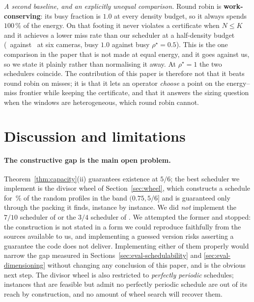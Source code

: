 \documentclass[preprint,review,12pt]{elsarticle}
\theoremstyle{definition}
\newcommand{\Nc}{N}
\newcommand{\dens}{\rho}
\begin{document}
\emph{A second baseline, and an explicitly unequal comparison.} Round robin is
\textbf{work-conserving}: its busy fraction is $1.0$ at every density budget, so it always spends
$100\,\%$ of the energy. On that footing it never violates a certificate when $\Nc\le K$ and it
achieves a lower miss rate than our scheduler at a half-density budget (\numRRMissSix\ against
\numRROursSix\ at six cameras, busy $1.0$ against busy $\dens^\star=0.5$). This is the one
comparison in the paper that is not made at equal energy, and it goes against us, so we state it
plainly rather than normalising it away. At $\dens^\star=1$ the two schedulers coincide. The contribution of this paper is therefore not that it beats
round robin on misses; it is that it lets an operator \emph{choose} a point on the energy--miss
frontier while keeping the certificate, and that it answers the sizing question when the windows
are heterogeneous, which round robin cannot.

\section{Discussion and limitations}\label{sec:limitations}

\paragraph{The constructive gap is the main open problem.} Theorem~\ref{thm:capacity}(ii)
guarantees existence at $5/6$; the best scheduler we implement is the divisor wheel of
Section~\ref{sec:wheel}, which constructs a schedule for \numEoneWheelEightPct\,\% of the random
profiles in the band $(0.75,5/6]$ and is guaranteed only through the packing it finds, instance by
instance. We did \emph{not} implement the $7/10$ scheduler of \cite{chanchin1993schedulers} or the
$3/4$ scheduler of \cite{fishburn2002densities}. We attempted the former and stopped: the
construction is not stated in a form we could reproduce faithfully from the sources available to
us, and implementing a guessed version risks asserting a guarantee the code does not deliver.
Implementing either of them properly would narrow the gap measured in
Sections~\ref{sec:eval-schedulability} and \ref{sec:eval-dimensioning} without changing any
conclusion of this paper, and is the obvious next step. The divisor wheel is also restricted to
\emph{perfectly periodic} schedules; instances that are feasible but admit no perfectly periodic
schedule are out of its reach by construction, and no amount of wheel search will recover them.
\end{document}
